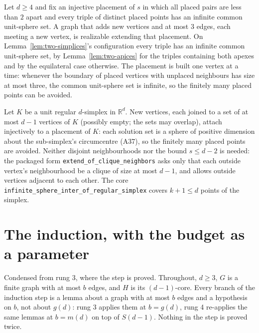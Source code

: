 \begin{lemma}
  \label{lem:tail-three}
  \leanok
  Let $d \ge 4$ and fix an injective placement of $s$ in which all placed pairs are less
  than $2$ apart and every triple of distinct placed points has an infinite common
  unit-sphere set. A graph that adds new vertices and at most $3$ edges, each meeting a new
  vertex, is realizable extending that placement. On
  Lemma~\ref{lem:two-simplices}'s configuration every triple has an infinite common
  unit-sphere set, by Lemma~\ref{lem:two-apices} for the triples containing both apexes and
  by the equilateral case otherwise. The placement is built one vertex at a time: whenever
  the boundary of placed vertices with unplaced neighbours has size at most three, the
  common unit-sphere set is infinite, so the finitely many placed points can be avoided.
\end{lemma}

\begin{lemma}
  \label{lem:simplex-attach}
  \leanok
  Let $K$ be a unit regular $d$-simplex in $\mathbb{R}^d$. New vertices, each joined to a
  set of at most $d - 1$ vertices of $K$ (possibly empty; the sets may overlap), attach
  injectively to a placement of $K$: each solution set is a sphere of positive dimension
  about the sub-simplex's circumcentre (A37), so the finitely many placed points are
  avoided. Neither disjoint neighbourhoods nor the bound $s \le d - 2$ is needed: the
  packaged form \texttt{extend\_of\_clique\_neighbors} asks only that each outside vertex's
  neighbourhood be a clique of size at most $d - 1$, and allows outside vertices adjacent to
  each other. The core \texttt{infinite\_sphere\_inter\_of\_regular\_simplex} covers $k + 1
  \le d$ points of the simplex.
\end{lemma}

\section{The induction, with the budget as a parameter}
\label{sec:induction}

Condensed from rung 3, where the step is proved. Throughout, $d \ge 3$, $G$ is a finite
graph with at most $b$ edges, and $H$ is its $(d-1)$-core. Every branch of the induction
step is a lemma about a graph with at most $b$ edges and a hypothesis on $b$, not about
$g(d)$: rung 3 applies them at $b = g(d)$, rung 4 re-applies the same lemmas at
$b = m(d)$ on top of $S(d-1)$. Nothing in the step is proved twice.

